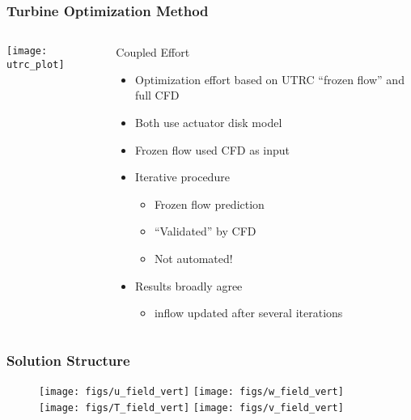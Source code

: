 \documentclass[mathserif]{beamer}
\begin{document}
%
%
\begin{frame}
 \frametitle{Turbine Optimization Method}

 \begin{columns}[]
  \begin{column}{0.55\linewidth}
   \begin{center}
    \texttt{[image: utrc\_plot]}
   \end{center}

  \end{column}
    \begin{column}{0.45\linewidth}

     \begin{block}{Coupled Effort}
     \begin{itemize}
      \item Optimization effort based on UTRC ``frozen flow''
	    and full CFD
      \item Both use actuator disk model
      \item Frozen flow used CFD as input
      \item Iterative procedure
	    \begin{itemize}
	     \item Frozen flow prediction 
	     \item ``Validated'' by CFD
	     \item Not automated!
	    \end{itemize}
      \item Results broadly agree
	    \begin{itemize}
	     \item inflow updated after several iterations
	    \end{itemize}
     \end{itemize}

      \end{block}
    \end{column}
 \end{columns}
\end{frame}


%
%
\begin{frame}
 \frametitle{Solution Structure}


\begin{figure}[!htb]
  \centering
  \texttt{[image: figs/u\_field\_vert]}
  \hfill
  \texttt{[image: figs/w\_field\_vert]}
  \\
  \texttt{[image: figs/T\_field\_vert]}
  \hfill
  \texttt{[image: figs/v\_field\_vert]}
\end{figure}

\end{frame}
\end{document}
